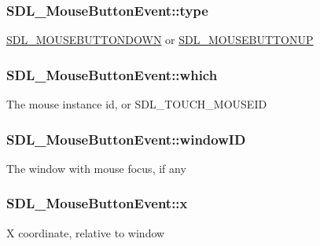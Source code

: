 \subsubsection[{type}]{ S\+D\+L\+\_\+\+Mouse\+Button\+Event\+::type}\label{structSDL__MouseButtonEvent_af64cb09ea68b8081ecc8ee498552e3d7}
\hyperlink{SDL__events_8h_a3b589e89be6b35c02e0dd34a55f3fccaa9267166e1536dfa8b0daa98c0afa9052}{S\+D\+L\+\_\+\+M\+O\+U\+S\+E\+B\+U\+T\+T\+O\+N\+D\+O\+W\+N} or \hyperlink{SDL__events_8h_a3b589e89be6b35c02e0dd34a55f3fccaa4ab85278398d29b9e50f500aad2b952b}{S\+D\+L\+\_\+\+M\+O\+U\+S\+E\+B\+U\+T\+T\+O\+N\+U\+P} \hypertarget{structSDL__MouseButtonEvent_a366aef59a0f393afc8a3561e741825df}{}
\subsubsection[{which}]{ S\+D\+L\+\_\+\+Mouse\+Button\+Event\+::which}\label{structSDL__MouseButtonEvent_a366aef59a0f393afc8a3561e741825df}
The mouse instance id, or S\+D\+L\+\_\+\+T\+O\+U\+C\+H\+\_\+\+M\+O\+U\+S\+E\+I\+D \hypertarget{structSDL__MouseButtonEvent_ab3b855d4b543b5d02fcf5d56e4421393}{}
\subsubsection[{window\+I\+D}]{ S\+D\+L\+\_\+\+Mouse\+Button\+Event\+::window\+I\+D}\label{structSDL__MouseButtonEvent_ab3b855d4b543b5d02fcf5d56e4421393}
The window with mouse focus, if any \hypertarget{structSDL__MouseButtonEvent_a5bb9c61b86e999f58637511e32e3a076}{}
\subsubsection[{x}]{ S\+D\+L\+\_\+\+Mouse\+Button\+Event\+::x}\label{structSDL__MouseButtonEvent_a5bb9c61b86e999f58637511e32e3a076}
X coordinate, relative to window \hypertarget{structSDL__MouseButtonEvent_a7ccb5c55a7ddadce723f4ea6d5269540}{}
